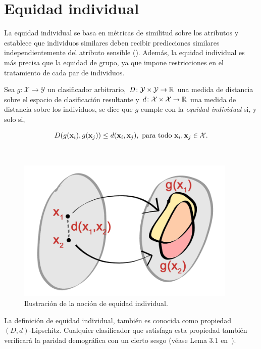 \documentclass[oneside,openright,titlepage,numbers=noenddot,openany,headinclude,footinclude=true,
cleardoublepage=empty,abstractoff,BCOR=5mm,paper=a4,fontsize=12pt,main=spanish]{scrreprt}
\begin{document}
\section{Equidad individual}

La equidad individual se basa en métricas de similitud sobre los atributos y  establece que individuos similares deben recibir predicciones similares independientemente del atributo sensible (\cite{detect2012}). Además, la equidad individual es más precisa que la equidad de grupo, ya que impone restricciones en el tratamiento de cada par de individuos.\\ 

\begin{definition} \label{def:indvfair}
Sea $g\colon \mathcal{X} \to \mathcal{Y}$ un clasificador arbitrario, $D\colon \mathcal{Y} \times \mathcal{Y} \to \mathbb{R}$ una medida de distancia sobre el espacio de clasificación resultante y $d\colon \mathcal{X} \times \mathcal{X} \to \mathbb{R}$ una medida de distancia sobre los individuos, se dice que $g$ cumple con la \textit{equidad individual} si, y solo si,

\begin{equation*} 
D(g(\textbf{x}_i),g(\textbf{x}_j))\leq d(\textbf{x}_i,\textbf{x}_j), \ \text{para todo} \ \textbf{x}_i,\textbf{x}_j \in \mathcal{X}.
\end{equation*}
\end{definition}\

\begin{figure}[h]
	\centering
	\includegraphics[width=10.5cm]{individual_fair.jpg}
	\caption{Ilustración de la noción de equidad individual.}
    \label{fig:individual_fairness}
\end{figure}

La definición de equidad individual, también es conocida como propiedad $(D,d)$-Lipschitz. Cualquier clasificador que satisfaga esta propiedad también verificará la paridad demográfica con un cierto sesgo (véase Lema 3.1 en~\cite{detect2012}).
\end{document}
